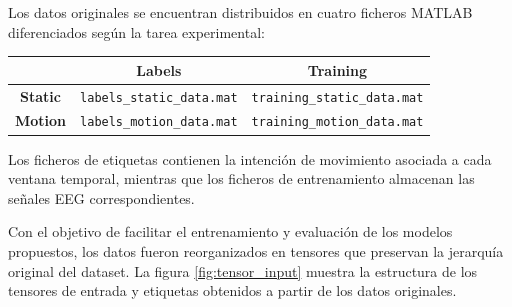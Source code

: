 Los datos originales se encuentran distribuidos en cuatro ficheros MATLAB diferenciados según la tarea experimental:

\begin{center}
    \begin{tabular}{|c|c|c|}
        \hline
                        & \textbf{Labels}                   & \textbf{Training}                   \\ \hline
        \textbf{Static} & \texttt{labels\_static\_data.mat} & \texttt{training\_static\_data.mat} \\ \hline
        \textbf{Motion} & \texttt{labels\_motion\_data.mat} & \texttt{training\_motion\_data.mat} \\ \hline
    \end{tabular}
\end{center}

Los ficheros de etiquetas contienen la intención de movimiento asociada a cada ventana temporal, mientras que los ficheros de entrenamiento almacenan las señales EEG correspondientes.

Con el objetivo de facilitar el entrenamiento y evaluación de los modelos propuestos, los datos fueron reorganizados en tensores que preservan la jerarquía original del dataset. La figura \ref{fig:tensor_input} muestra la estructura de los tensores de entrada y etiquetas obtenidos a partir de los datos originales.


